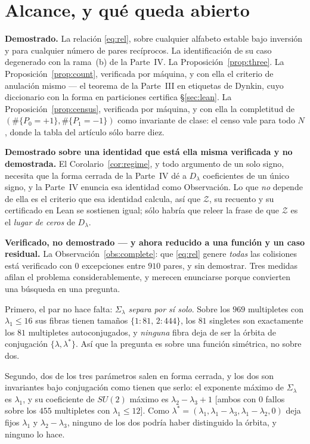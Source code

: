 \documentclass[11pt,a4paper]{article}
\newcommand{\Sig}{\Sigma_\lambda}
\newcommand{\Dl}{D_\lambda}
\begin{document}
\section{Alcance, y qué queda abierto}\label{sec:scope}

\textbf{Demostrado.} La relación \eqref{eq:rel}, sobre cualquier alfabeto estable bajo inversión y
para cualquier número de pares recíprocos. La identificación de su caso degenerado con la rama~(b) de
la Parte~IV. La Proposición~\ref{prop:three}. La Proposición~\ref{prop:count}, verificada por
máquina, y con ella el criterio de anulación mismo --- el teorema de la Parte~III en etiquetas de
Dynkin, cuyo diccionario con la forma en particiones certifica \S\ref{sec:lean}. La
Proposición~\ref{prop:census}, verificada por máquina, y con ella la completitud de
$(\#\{P_0{=}+1\},\#\{P_1{=}-1\})$ como invariante de clase: el censo vale para todo $N$, donde la
tabla del artículo sólo barre diez.

\textbf{Demostrado sobre una identidad que está ella misma verificada y no demostrada.} El
Corolario~\ref{cor:regime}, y todo argumento de un solo signo, necesita que la forma cerrada de la
Parte~IV dé a $\Dl$ coeficientes de un único signo, y la Parte~IV enuncia esa identidad como
Observación. Lo que \emph{no} depende de ella es el criterio que esa identidad calcula, así que
$\mathcal Z$, su recuento y su certificado en Lean se sostienen igual; sólo habría que releer la
frase de que $\mathcal Z$ es el \emph{lugar de ceros} de $\Dl$.

\textbf{Verificado, no demostrado --- y ahora reducido a una función y un caso residual.} La
Observación~\ref{obs:complete}: que \eqref{eq:rel} genere \emph{todas} las colisiones está verificado
con $0$ excepciones entre $910$ pares, y sin demostrar. Tres medidas afilan el problema considerablemente, y merecen enunciarse
porque convierten una búsqueda en una pregunta.

Primero, el par no hace falta: \emph{$\Sig$ separa por sí solo}. Sobre los $969$ multipletes con
$\lambda_1\le16$ sus fibras tienen tamaños $\{1:81,\,2:444\}$, los $81$ singletes son exactamente los
$81$ multipletes autoconjugados, y \emph{ninguna} fibra deja de ser la órbita de conjugación
$\{\lambda,\lambda^*\}$. Así que la pregunta es sobre una función simétrica, no sobre dos.

Segundo, dos de los tres parámetros salen en forma cerrada, y los dos son invariantes bajo conjugación
como tienen que serlo: el exponente máximo de $\Sig$ es $\lambda_1$, y su coeficiente de $SU(2)$
máximo es $\lambda_2-\lambda_3+1$ [ambos con $0$ fallos sobre los $455$ multipletes con
$\lambda_1\le12$]. Como $\lambda^*=(\lambda_1,\lambda_1-\lambda_3,\lambda_1-\lambda_2,0)$ deja fijos
$\lambda_1$ y $\lambda_2-\lambda_3$, ninguno de los dos podría haber distinguido la órbita, y ninguno
lo hace.
\end{document}
